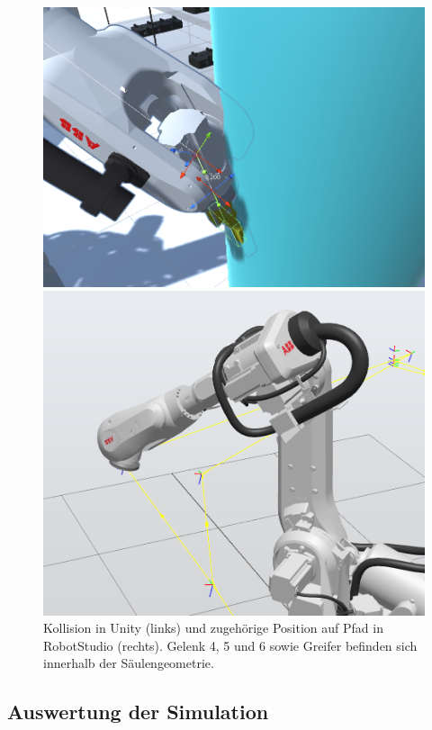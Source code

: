 \begin{figure}[!htb]
	\centering
	\begin{minipage}{.535\textwidth}
		\centering
		\includegraphics[width=0.9\linewidth]{Figures/CollisionUnity.png}
	\end{minipage}%
	\begin{minipage}{0.465\textwidth}
		\centering
		\includegraphics[width=0.9\linewidth]{Figures/CollisionPathRobotStudio.png}
	\end{minipage}
	\caption{Kollision in Unity (links) und zugehörige Position auf Pfad in
		RobotStudio (rechts). Gelenk 4, 5 und 6 sowie Greifer befinden sich innerhalb der
		Säulengeometrie.}
	\label{figure:kollision}
\end{figure}

\subsection{Auswertung der Simulation}

